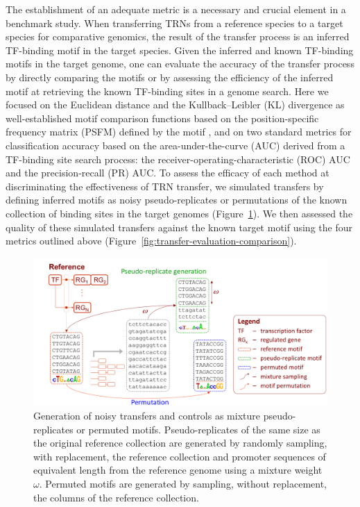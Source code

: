 The establishment of an adequate metric is a necessary and crucial element in a
benchmark study. When transferring TRNs from a reference species to a target
species for comparative genomics, the result of the transfer process is an
inferred TF-binding motif in the target species. Given the inferred and known
TF-binding motifs in the target genome, one can evaluate the accuracy of the
transfer process by directly comparing the motifs or by assessing the
efficiency of the inferred motif at retrieving the known TF-binding sites in a
genome search. Here we focused on the Euclidean distance and the
Kullback–Leibler (KL) divergence as well-established motif comparison functions
based on the position-specific frequency matrix (PSFM) defined by the motif
\citep{gupta2007quantifying}, and on two standard metrics for classification
accuracy based on the area-under-the-curve (AUC) derived from a TF-binding site
search process: the receiver-operating-characteristic (ROC) AUC and the
precision-recall (PR) AUC. To
assess the efficacy of each method at discriminating the effectiveness of TRN
transfer, we simulated transfers by defining inferred motifs as noisy
pseudo-replicates or permutations of the known collection of binding sites in
the target genomes (Figure~\ref{fig:pseudoreplicate-generation}). We then
assessed the quality of these simulated transfers against the known target
motif using the four metrics outlined above
(Figure~\ref{fig:transfer-evaluation-comparison}).

\begin{figure}
  \centering
  \includegraphics[width=\textwidth]{figures/chapter3/pseudoreplicate-generation}
  \caption[Generation of noisy transfers and controls as mixture
  pseudo-replicates or permuted motifs.]{Generation of noisy transfers and
    controls as mixture pseudo-replicates or permuted motifs. Pseudo-replicates
    of the same size as the original reference collection are generated by
    randomly sampling, with replacement, the reference collection and promoter
    sequences of equivalent length from the reference genome using a mixture
    weight $\omega$. Permuted motifs are generated by sampling, without
    replacement, the columns of the reference collection.}
\label{fig:pseudoreplicate-generation}
\end{figure}

